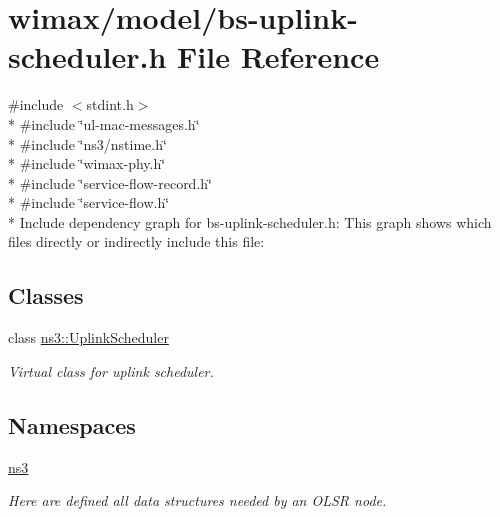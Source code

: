 \hypertarget{bs-uplink-scheduler_8h}{}\section{wimax/model/bs-\/uplink-\/scheduler.h File Reference}
\label{bs-uplink-scheduler_8h}
{\ttfamily \#include $<$stdint.\+h$>$}\\*
{\ttfamily \#include \char`\"{}ul-\/mac-\/messages.\+h\char`\"{}}\\*
{\ttfamily \#include \char`\"{}ns3/nstime.\+h\char`\"{}}\\*
{\ttfamily \#include \char`\"{}wimax-\/phy.\+h\char`\"{}}\\*
{\ttfamily \#include \char`\"{}service-\/flow-\/record.\+h\char`\"{}}\\*
{\ttfamily \#include \char`\"{}service-\/flow.\+h\char`\"{}}\\*
Include dependency graph for bs-\/uplink-\/scheduler.h\+:
This graph shows which files directly or indirectly include this file\+:
\subsection*{Classes}
\begin{DoxyCompactItemize}
\item 
class \hyperlink{classns3_1_1UplinkScheduler}{ns3\+::\+Uplink\+Scheduler}
\begin{DoxyCompactList}\small\item\em Virtual class for uplink scheduler. \end{DoxyCompactList}\end{DoxyCompactItemize}
\subsection*{Namespaces}
\begin{DoxyCompactItemize}
\item 
 \hyperlink{namespacens3}{ns3}
\begin{DoxyCompactList}\small\item\em Here are defined all data structures needed by an O\+L\+SR node. \end{DoxyCompactList}\end{DoxyCompactItemize}
